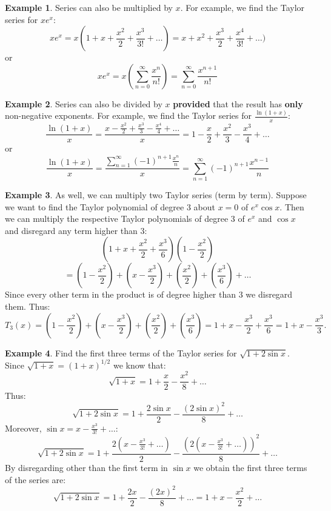 \documentclass[12pt]{article}
\theoremstyle{definition}
\newtheorem{exa}{Example}
\newcommand{\sumn}{\sum_{n=1}^\infty }
\newcommand{\sumno}{\sum_{n=0}^\infty }
\begin{document}
\begin{exa}
Series can also be multiplied by $x$. For example, we find the Taylor series for $xe^x$:
$$xe^x= x(1+x+\frac{x^2}{2}+\frac{x^3}{3!}+\ldots)= x+x^2+\frac{x^3}{2}+\frac{x^4}{3!}+\ldots)$$
or
$$xe^x= x \left( \sumno \frac{x^n}{n!} \right)=\sumno \frac{x^{n+1}}{n!}$$
\end{exa}

\begin{exa}
Series can also be divided by $x$ {\bf provided} that the result has {\bf only} non-negative exponents. For example, we find the Taylor series for $\frac{\ln(1+x)}{x}$:
$$\frac{\ln(1+x)}{x}=\frac{x-\frac{x^2}{2}+\frac{x^3}{3}-\frac{x^4}{4}+\ldots}{x}= 1-\frac{x}{2}+\frac{x^2}{3}-\frac{x^3}{4}+\ldots $$ 
or
$$\frac{\ln(1+x)}{x}= \frac{\sumn (-1)^{n+1}\frac{x^n}{n}}{x}=\sumn (-1)^{n+1}\frac{x^{n-1}}{n}$$
\end{exa}

\begin{exa}
As well, we can multiply two Taylor series (term by term). Suppose we want to find the Taylor polynomial of degree $3$ about $x=0$ of $e^x\cos x$. Then we can multiply the respective Taylor polynomials of degree $3$ of $e^x$ and $\cos x$ and disregard any term higher than $3$:
$$\left(1+x+\frac{x^2}{2}+\frac{x^3}{6}\right)\left(1-\frac{x^2}{2}\right)$$
$$= \left(1-\frac{x^2}{2}\right) + \left(x-\frac{x^3}{2}\right) + \left(\frac{x^2}{2}\right) + \left(\frac{x^3}{6}\right)+\ldots $$
Since every other term in the product is of degree higher than $3$ we disregard them. Thus:
$$T_3(x)=\left(1-\frac{x^2}{2}\right) + \left(x-\frac{x^3}{2}\right) + \left(\frac{x^2}{2}\right) + \left(\frac{x^3}{6}\right)=1+x-\frac{x^3}{2}+\frac{x^3}{6}=1+x-\frac{x^3}{3}.$$
\end{exa}

\begin{exa}
Find the first three terms of the Taylor series for $\sqrt{1+2\sin x}$. Since $\sqrt{1+x}=(1+x)^{1/2}$ we know that:
$$\sqrt{1+x}=1+\frac{x}{2}-\frac{x^2}{8}+\ldots$$
Thus:
$$\sqrt{1+2\sin x}= 1+\frac{2\sin x}{2}-\frac{(2\sin x)^2}{8}+\ldots$$
Moreover, $\sin x = x - \frac{x^3}{3!}+\ldots$:
$$\sqrt{1+2\sin x}= 1+\frac{2(x - \frac{x^3}{3!}+\ldots)}{2}-\frac{(2(x - \frac{x^3}{3!}+\ldots))^2}{8}+\ldots$$
By disregarding other than the first term in $\sin x$ we obtain the first three terms of the series are:
$$\sqrt{1+2\sin x}=1 + \frac{2x}{2} - \frac{(2x)^2}{8}+\ldots=1+x-\frac{x^2}{2}+\ldots$$
\end{exa}
\end{document}

